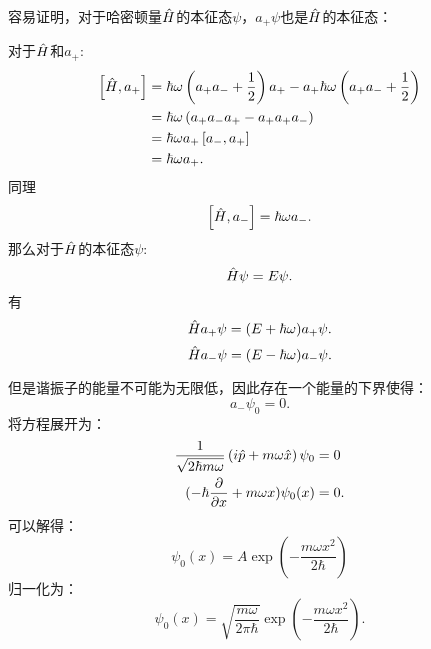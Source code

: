 容易证明，对于哈密顿量$\hat{H}$的本征态$\psi$，$a_+\psi$也是$\hat{H}$的本征态：
\begin{graybox}[Proof]
对于$\hat{H}$和$a_+$:
\begin{equation}
    \begin{aligned}
        \left[\hat{H},a_+\right]&=\hbar\omega\left(a_+a_-+\frac{1}{2}\right)a_+-a_+\hbar\omega\left(a_+a_-+\frac{1}{2}\right)\\
        &=\hbar\omega\left(a_+a_-a_+-a_+a_+a_-\right)\\
        &=\hbar\omega a_+\left[a_-,a_+\right]\\
        &=\hbar\omega a_+.
    \end{aligned}
\end{equation}
同理
\begin{equation}
    \left[\hat{H},a_-\right]=\hbar\omega a_-.
\end{equation}
那么对于$\hat{H}$的本征态$\psi$:
\begin{equation}
    \hat{H}\psi=E\psi.
\end{equation}
有 
\begin{equation}
    \hat{H}a_+\psi=(E+\hbar\omega)a_+\psi.
\end{equation}
\begin{equation}
    \hat{H}a_-\psi=(E-\hbar\omega)a_-\psi.
\end{equation}
\end{graybox}

但是谐振子的能量不可能为无限低，因此存在一个能量的下界使得：
\begin{equation}
    a_-\psi_0=0.
\end{equation}
将方程展开为：
\begin{equation}
    \begin{aligned}
        \frac{1}{\sqrt{2\hbar m\omega}}\left(i\hat{p}+m\omega \hat{x}\right)\psi_0&=0\\
        (-\hbar\frac{\partial }{\partial x}+m\omega x)\psi_0(x)&=0.
    \end{aligned}
\end{equation}
可以解得：
\begin{equation}
    \psi_0(x)=A\exp\left(-\frac{m\omega x^2}{2\hbar}\right)
\end{equation}
归一化为：
\begin{equation}
    \psi_0(x)=\sqrt{\frac{m\omega}{2\pi\hbar}}\exp\left(-\frac{m\omega x^2}{2\hbar}\right).
\end{equation}

